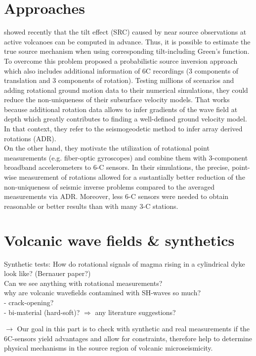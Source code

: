 \documentclass[12pt, a4paper]{article}
\begin{document}
\section*{Approaches}
\citet{Maeda2011, vanDriel2012} showed recently that the tilt effect (SRC) caused by near source observations at active volcanoes can be computed in advance. Thus, it is possible to estimate the true source mechanism when using corresponding tilt-including Green's function.
To overcome this problem \citet{Bernauer2014} proposed a probabilistic source inversion approach which also includes additional information of 6C recordings (3 components of translation and 3 components of rotation). Testing millions of scenarios and adding rotational ground motion data to their numerical simulations, they could reduce the non-uniqueness of their subsurface velocity models. That works because additional rotation data allows to infer gradients of the wave field at depth which greatly contributes to finding a well-defined ground velocity model. In that context, they refer to the seismogeodetic method \citep{Spudich1995, Spudich2008} to infer array derived rotations (ADR).\\
On the other hand, they motivate the utilization of rotational point measurements (e.g. fiber-optic gyroscopes) and combine them with 3-component broadband accelerometers to 6-C sensors. In their simulations, the precise, point-wise measurement of rotations allowed for a sustantially better reduction of the non-uniqueness of seismic inverse problems compared to the averaged measurements via ADR. Moreover, less 6-C sensors were needed to obtain reasonable or better results than with many 3-C stations.\\
\section*{Volcanic wave fields \& synthetics}
Synthetic tests: How do rotational signals of magma rising in a cylindrical dyke look like? (Bernauer paper?)\\
Can we see anything with rotational measurements?\\

why are volcanic wavefields contamined with SH-waves so much?\\
- crack-opening?\\
- bi-material (hard-soft)?
$\Rightarrow$ any literature suggestions?

$\rightarrow$ Our goal in this part is to check with synthetic and real measurements if the 6C-sensors yield advantages and allow for constraints, therefore help to determine physical mechanisms in the source region of volcanic microseismicity. 



\label{Bibliography}
\begin{singlespace*}
\small{

}
\end{singlespace*}
\end{document}
